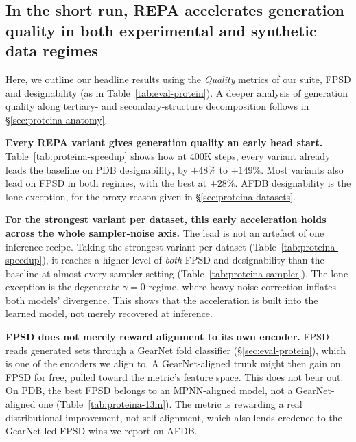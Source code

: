\documentclass[12pt,a4paper,twoside]{report}
\begin{document}
\subsection{In the short run, REPA accelerates generation quality in both experimental and synthetic data regimes}
\label{sec:proteina-convergence}
\label{sec:proteina-genrep}

Here, we outline our headline results using the \emph{Quality} metrics of our suite, FPSD and designability (as in Table~\ref{tab:eval-protein}). A deeper analysis of generation quality along tertiary- and secondary-structure decomposition follows in \S\ref{sec:proteina-anatomy}.

\textbf{Every REPA variant gives generation quality an early head start.} Table~\ref{tab:proteina-speedup} shows how at 400K steps, every variant already leads the baseline on PDB designability, by $+48\%$ to $+149\%$. Most variants also lead on FPSD in both regimes, with the best at $+28\%$. AFDB designability is the lone exception, for the proxy reason given in \S\ref{sec:proteina-datasets}.



\textbf{For the strongest variant per dataset, this early acceleration holds across the whole sampler-noise axis.} The lead is not an artefact of one inference recipe. Taking the strongest variant per dataset (Table~\ref{tab:proteina-speedup}), it reaches a higher level of \emph{both} FPSD and designability than the baseline at almost every sampler setting (Table~\ref{tab:proteina-sampler}). The lone exception is the degenerate $\gamma{=}0$ regime, where heavy noise correction inflates both models' divergence. This shows that the acceleration is built into the learned model, not merely recovered at inference.



\textbf{FPSD does not merely reward alignment to its own encoder.} FPSD reads generated sets through a GearNet fold classifier (\S\ref{sec:eval-protein}), which is one of the encoders we align to. A GearNet-aligned trunk might then gain on FPSD for free, pulled toward the metric's feature space. This does not bear out. On PDB, the best FPSD belongs to an MPNN-aligned model, not a GearNet-aligned one (Table~\ref{tab:proteina-13m}). The metric is rewarding a real distributional improvement, not self-alignment, which also lends credence to the GearNet-led FPSD wins we report on AFDB.
\end{document}
